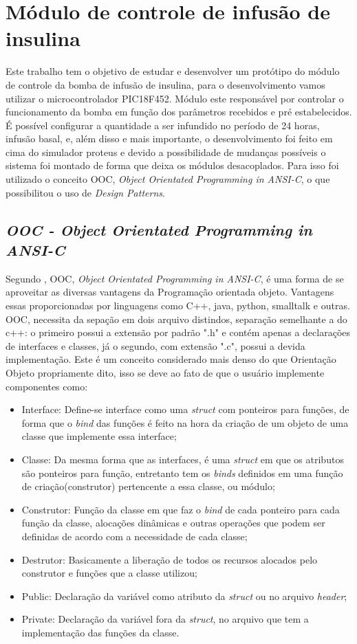 \chapter{Módulo de controle de infusão de insulina}
Este trabalho tem o objetivo de estudar e desenvolver um protótipo do módulo de controle da bomba de infusão de insulina, para o desenvolvimento vamos utilizar o microcontrolador PIC18F452. Módulo este responsável por controlar o funcionamento da bomba em função dos parâmetros recebidos e pré estabelecidos. É possível configurar a quantidade a ser infundido no período de 24 horas, infusão basal, e, além disso e mais importante, o desenvolvimento foi feito em cima do simulador proteus e devido a possibilidade de mudanças possíveis o sistema foi montado de forma que deixa os módulos desacoplados. Para isso foi utilizado o conceito OOC, \emph{Object Orientated Programming in ANSI-C}, o que possibilitou o uso de \emph{Design Patterns}.

\section{\emph{OOC - \emph{Object Orientated Programming in ANSI-C}}}
Segundo \cite{schreiner1993object}, OOC, \emph{Object Orientated Programming in ANSI-C}, é uma forma de se aproveitar as diversas vantagens da Programação orientada objeto. Vantagens essas proporcionadas por linguagens como C++, java, python, smalltalk e outras. OOC, necessita da sepação em dois arquivo distindos, separação semelhante a do c++: o primeiro possui a extensão por padrão ".h" e contém apenas a declarações de interfaces e classes, já o segundo, com extensão ".c", possui a devida implementação. Este é um conceito considerado mais denso do que Orientação Objeto propriamente dito, isso se deve ao fato de que o usuário implemente componentes como: 

\begin{itemize}
\item Interface: Define-se interface como uma \emph{struct} com ponteiros para funções, de forma que o \emph{bind} das funções é feito na hora da criação de um objeto de uma classe que implemente essa interface;
\item Classe: Da mesma forma que as interfaces, é uma \emph{struct} em que os atributos são ponteiros para função, entretanto tem os \emph{binds} definidos em uma função de criação(construtor) pertencente a essa classe, ou módulo;
\item Construtor: Função da classe em que faz o \emph{bind} de cada ponteiro para cada função da classe, alocações dinâmicas e outras operações que podem ser definidas de acordo com a necessidade de cada classe;
\item Destrutor: Basicamente a liberação de todos os recursos alocados pelo construtor e funções que a classe utilizou;
\item Public: Declaração da variável como atributo da \emph{struct} ou no arquivo \emph{header};
\item Private: Declaração da variável fora da \emph{struct}, no arquivo que tem a implementação das funções da classe.
\end{itemize}

